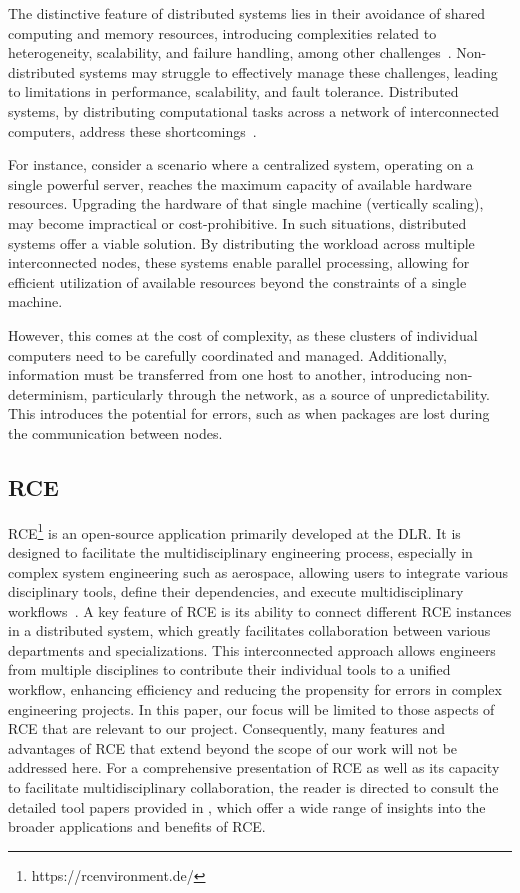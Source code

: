 The distinctive feature of distributed systems lies in their avoidance of shared computing and memory resources, introducing complexities related to heterogeneity, scalability, and failure handling, among other challenges~\cite{coulouris2005distributed}. Non-distributed systems may struggle to effectively manage these challenges, leading to limitations in performance, scalability, and fault tolerance. Distributed systems, by distributing computational tasks across a network of interconnected computers, address these shortcomings~\cite{coulouris2005distributed}.

For instance, consider a scenario where a centralized system, operating on a single powerful server, reaches the maximum capacity of available hardware resources. Upgrading the hardware of that single machine (vertically scaling), may become impractical or cost-prohibitive. In such situations, distributed systems offer a viable solution. By distributing the workload across multiple interconnected nodes, these systems enable parallel processing, allowing for efficient utilization of available resources beyond the constraints of a single machine. 

However, this comes at the cost of complexity, as these clusters of individual computers need to be carefully coordinated and managed. Additionally, information must be transferred from one host to another, introducing non-determinism, particularly through the network, as a source of unpredictability. This introduces the potential for errors, such as when packages are lost during the communication between nodes.

\subsection{\acl{RCE}}
\label{subsec:rce}
\ac{RCE}\footnote{https://rcenvironment.de/} is an open-source application primarily developed at the \ac{DLR}. It is designed to facilitate the multidisciplinary engineering process, especially in complex system engineering such as aerospace, allowing users to integrate various disciplinary tools, define their dependencies, and execute multidisciplinary workflows~\cite{BODEN2021100759}. A key feature of \ac{RCE} is its ability to connect different \ac{RCE} instances in a distributed system, which greatly facilitates collaboration between various departments and specializations. This interconnected approach allows engineers from multiple disciplines to contribute their individual tools to a unified workflow, enhancing efficiency and reducing the propensity for errors in complex engineering projects. In this paper, our focus will be limited to those aspects of \ac{RCE} that are relevant to our project. Consequently, many features and advantages of \ac{RCE} that extend beyond the scope of our work will not be addressed here. For a comprehensive presentation of \ac{RCE} as well as its capacity to facilitate multidisciplinary collaboration, the reader is directed to consult the detailed tool papers provided in \cite{BODEN2021100759,boden2019distributed}, which offer a wide range of insights into the broader applications and benefits of \ac{RCE}.~\cite{BODEN2021100759}

